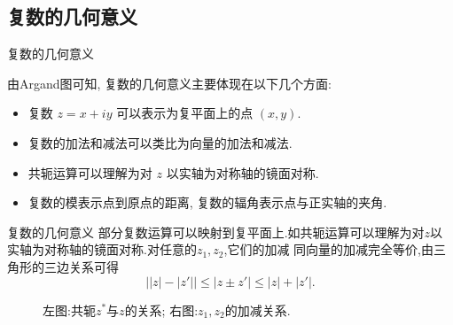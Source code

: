 \documentclass[fontset=windows, chinese, 10pt]{beamer}
\begin{document}
  \subsection{复数的几何意义}
  \begin{frame}{复数的几何意义}

    由Argand图可知, 复数的几何意义主要体现在以下几个方面:
  \begin{itemize}
  \item 复数 \( z = x + iy \) 可以表示为复平面上的点 \( (x, y) \).
  \item 复数的加法和减法可以类比为向量的加法和减法.
  \item 共轭运算可以理解为对 \( z \) 以实轴为对称轴的镜面对称.
  \item 复数的模表示点到原点的距离,  复数的辐角表示点与正实轴的夹角.
  \end{itemize}

\end{frame}

\begin{frame}{复数的几何意义}
  部分复数运算可以映射到复平面上.如共轭运算可以理解为对$z$以实轴为对称轴的镜面对称.对任意的$z_1,z_2$,它们的加减
同向量的加减完全等价,由三角形的三边关系可得
\begin{equation}
    \left| |z|- |z'| \right| \leq |z \pm z'| \leq |z| + |z'| .
\end{equation}
\begin{figure}[htb]
    \centering
    \scalebox{0.9}{
    
    
}
        \caption{左图:共轭$z^{*}$与$z$的关系; 右图:$z_1, z_2$的加减关系.}
\end{figure}

  \end{frame}
  
\end{document}

